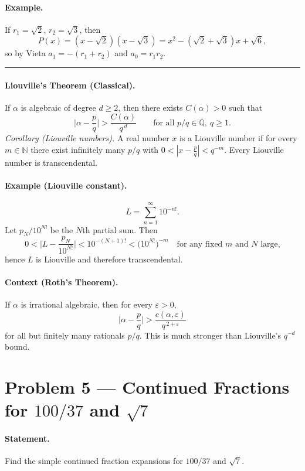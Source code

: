 \documentclass[12pt,a4paper]{article}
\theoremstyle{plain}
\theoremstyle{definition}
\theoremstyle{remark}
\theoremstyle{remark}
\begin{document}
\paragraph{Example.}
If $r_1=\sqrt2$, $r_2=\sqrt3$, then
\[
P(x)=(x-\sqrt2)(x-\sqrt3)=x^2-(\sqrt2+\sqrt3)x+\sqrt6,
\]
so by Vieta $a_1=-(r_1+r_2)$ and $a_0=r_1r_2$.

\noindent\rule{\textwidth}{0.4pt}

\paragraph{Liouville's Theorem (Classical).}
If $\alpha$ is algebraic of degree $d\ge2$, then there exists $C(\alpha)>0$ such that
\[
\Big|\alpha-\frac{p}{q}\Big|>\frac{C(\alpha)}{q^{\,d}}
\qquad\text{for all } p/q\in\mathbb Q,\ q\ge1.
\]
\emph{Corollary (Liouville numbers).} A real number $x$ is a Liouville number if for every
$m\in\mathbb N$ there exist infinitely many $p/q$ with
$0<|x-\frac{p}{q}|<q^{-m}$. Every Liouville number is transcendental.

\paragraph{Example (Liouville constant).}
\[
L=\sum_{n=1}^\infty 10^{-n!}.
\]
Let $p_N/10^{N!}$ be the $N$th partial sum. Then
\[
0<\Big|L-\frac{p_N}{10^{N!}}\Big|<10^{-(N+1)!}
<\big(10^{N!}\big)^{-m}\quad\text{for any fixed }m\text{ and $N$ large,}
\]
hence $L$ is Liouville and therefore transcendental.

\paragraph{Context (Roth's Theorem).}
If $\alpha$ is irrational algebraic, then for every $\varepsilon>0$,
\[
\Big|\alpha-\frac{p}{q}\Big|>\frac{c(\alpha,\varepsilon)}{q^{\,2+\varepsilon}}
\]
for all but finitely many rationals $p/q$. This is much stronger than Liouville's $q^{-d}$ bound.

\section*{Problem 5 — Continued Fractions for $100/37$ and $\sqrt{7}$}

\paragraph{Statement.}
Find the simple continued fraction expansions for $100/37$ and $\sqrt7$.
\end{document}
